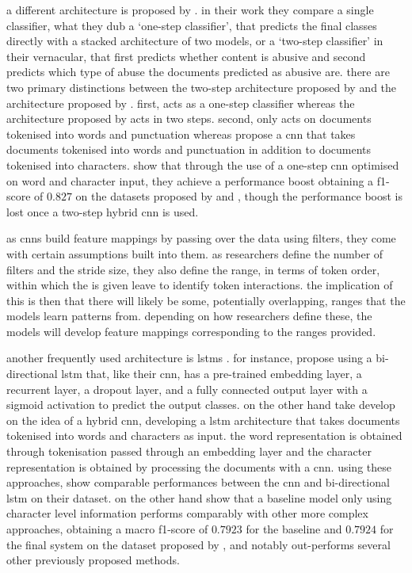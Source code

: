 a different architecture is proposed by \citet{park:2017}.
in their work they compare a single classifier, what they dub a `one-step classifier', that predicts the final classes directly with a stacked architecture of two models, or a `two-step classifier' in their vernacular, that first predicts whether content is abusive and second predicts which type of abuse the documents predicted as abusive are.
there are two primary distinctions between the two-step architecture proposed by \citet{park:2017} and the architecture proposed by \citet{kolhatkar:2020}.
first, \citet{kolhatkar:2020} acts as a one-step classifier whereas the architecture proposed by \citet{park:2017} acts in two steps.
second, \citet{kolhatkar:2020} only acts on documents tokenised into words and punctuation whereas \citet{park:2017} propose a cnn that takes documents tokenised into words and punctuation in addition to documents tokenised into characters.
\citet{park:2017} show that through the use of a one-step cnn optimised on word and character input, they achieve a performance boost obtaining a f1-score of $0.827$ on the datasets proposed by \citet{waseem-hovy:2016} and \citet{waseem:2016}, though the performance boost is lost once a two-step hybrid cnn is used.

as cnns build feature mappings by passing over the data using filters, they come with certain assumptions built into them.
as researchers define the number of filters and the stride size, they also define the range, in terms of token order, within which the is given leave to identify token interactions.
the implication of this is then that there will likely be some, potentially overlapping, ranges that the models learn patterns from.
depending on how researchers define these, the models will develop feature mappings corresponding to the ranges provided.

another frequently used architecture is lstms \citep{badjatiya:2017,kolhatkar:2020,meyer:2019}.
for instance, \citet{kolhatkar:2020} propose using a bi-directional lstm that, like their cnn, has a pre-trained embedding layer, a recurrent layer, a dropout layer, and a fully connected output layer with a sigmoid activation to predict the output classes.
\citet{meyer:2019} on the other hand take develop on the idea of a hybrid cnn, developing a lstm architecture that takes documents tokenised into words and characters as input.
the word representation is obtained through tokenisation passed through an embedding layer and the character representation is obtained by processing the documents with a cnn.
using these approaches, \citet{kolhatkar:2020} show comparable performances between the cnn and bi-directional lstm on their dataset.
\citet{meyer:2019} on the other hand show that a baseline model only using character level information performs comparably with other more complex approaches, obtaining a macro f1-score of $0.7923$ for the baseline and $0.7924$ for the final system on the dataset proposed by \citet{waseem-hovy:2016}, and notably out-performs several other previously proposed methods.


